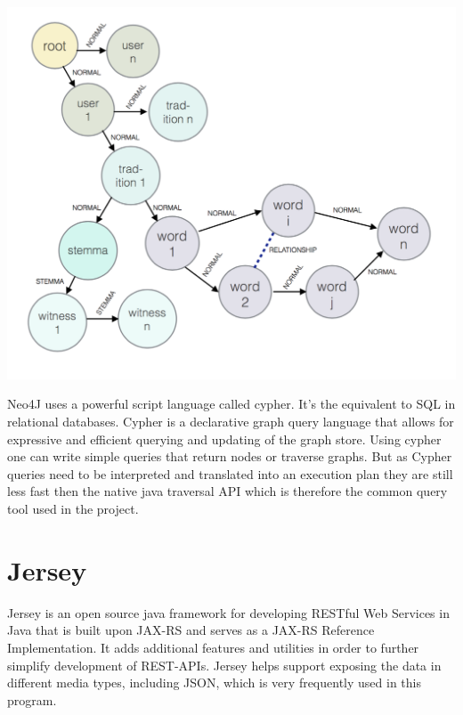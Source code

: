 \documentclass[11pt,fleqn,openany]{book} %
\begin{document}
\begin{center}
\includegraphics[scale=.5]{Pictures/database.png} 
\end{center} 
Neo4J uses a powerful script language called cypher. It’s the equivalent to SQL in relational databases. Cypher is a declarative graph query language that allows for expressive and efficient querying and updating of the graph store. Using cypher one can write simple queries that return nodes or traverse graphs. But as Cypher queries need to be interpreted and translated into an execution plan they are still less fast then the native java traversal API which is therefore the common query tool used in the project.



\chapter{Jersey}
Jersey is an open source java framework for developing RESTful Web Services in Java that is built upon JAX-RS and serves as a JAX-RS Reference Implementation. It adds additional features and utilities in order to further simplify development of REST-APIs. Jersey helps support exposing the data in different media types, including JSON, which is very frequently used in this program. \\
\end{document}
